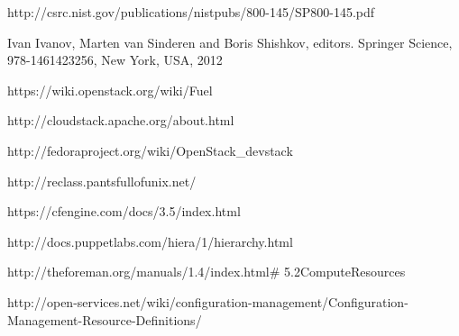 


\newblock http://csrc.nist.gov/publications/nistpubs/800-145/SP800-145.pdf

Ivan Ivanov, Marten van Sinderen and Boris Shishkov, editors.
\newblock Springer Science, 978-1461423256, New York, USA, 2012

\newblock https://wiki.openstack.org/wiki/Fuel

\newblock http://cloudstack.apache.org/about.html

\newblock http://fedoraproject.org/wiki/OpenStack\_devstack

\newblock http://reclass.pantsfullofunix.net/

\newblock https://cfengine.com/docs/3.5/index.html

\newblock http://docs.puppetlabs.com/hiera/1/hierarchy.html

\newblock http://theforeman.org/manuals/1.4/index.html\# 5.2ComputeResources

\newblock http://open-services.net/wiki/configuration-management/Configuration-Management-Resource-Definitions/